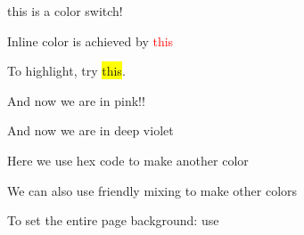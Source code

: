 \documentclass[12pt]{report}
\begin{document}
{\color{blue} this is a color switch!}

Inline color is achieved by \textcolor{red}{this}

To highlight, try \colorbox{yellow}{this}. 


And now we are in \textcolor{mypink1}{pink!!}

And now we are in \textcolor{Mywave}{deep violet}

Here we use hex code to make \textcolor{Mycolor2}{another color}

We can also use friendly mixing to make \textcolor{myviolet}{other colors}

To set the entire page background: use \pagecolor{mygray}
\end{document}

